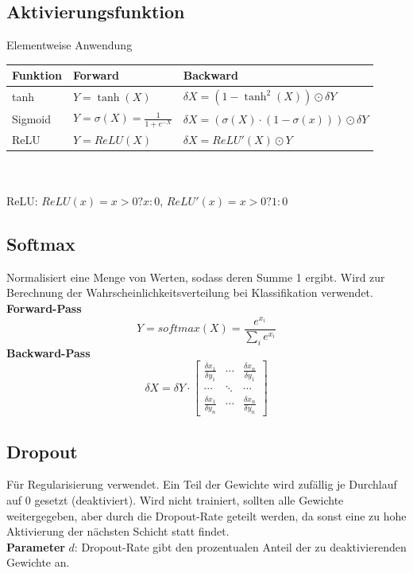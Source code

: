 \documentclass[12pt]{article}
\begin{document}
	\subsection{Aktivierungsfunktion}
	Elementweise Anwendung\\
	\begin{tabular}{|l|l|l|}
	\hline
	\textbf{Funktion} & \textbf{Forward} & \textbf{Backward}\\
	\hline
	tanh & $Y = \tanh(X)$ & $\delta X = (1 - \tanh^2(X)) \odot \delta Y$\\
	\hline
	Sigmoid & $Y = \sigma(X) = \frac{1}{1 + e^{-X}}$ & $\delta X = (\sigma(X) \cdot (1-\sigma(x))) \odot \delta Y$\\
	\hline
	ReLU & $Y = ReLU(X)$ & $\delta X = ReLU'(X) \odot Y$\\
	\hline
	\end{tabular}\\
	\\
	ReLU: $ReLU(x) = x > 0 ? x : 0$, $ReLU'(x) = x > 0 ? 1 : 0$
	\subsection{Softmax}
	Normalisiert eine Menge von Werten, sodass deren Summe 1 ergibt. Wird zur Berechnung der Wahrscheinlichkeitsverteilung bei Klassifikation verwendet.\\
	\textbf{Forward-Pass} $$Y = softmax(X) = \frac{e^{x_i}}{\sum_i e^{x_i}}$$
	\textbf{Backward-Pass} $$\delta X = \delta Y \cdot
	\begin{bmatrix}
	\frac{\delta x_1}{\delta y_1} & \cdots & \frac{\delta x_n}{\delta y_1}\\
	\cdots & \ddots & \cdots\\
	\frac{\delta x_1}{\delta y_n} & \cdots & \frac{\delta x_n}{\delta y_n}
	\end{bmatrix}
	$$
	\subsection{Dropout}
	Für Regularisierung verwendet. Ein Teil der Gewichte wird zufällig je Durchlauf auf 0 gesetzt (deaktiviert). Wird nicht trainiert, sollten alle Gewichte weitergegeben, aber durch die Dropout-Rate geteilt werden, da sonst eine zu hohe Aktivierung der nächsten Schicht statt findet.\\
	\textbf{Parameter} $d$: Dropout-Rate gibt den prozentualen Anteil der zu deaktivierenden Gewichte an.
\end{document}
